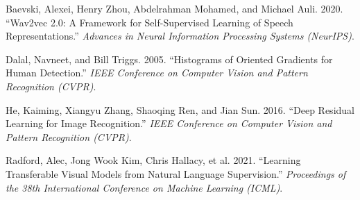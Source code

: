 \rujukanheading

\protect{}\label{refs}
\begin{CSLReferences}{1}{1}
Baevski, Alexei, Henry Zhou, Abdelrahman Mohamed, and Michael Auli. 2020. {``Wav2vec 2.0: A Framework for Self-Supervised Learning of Speech Representations.''} \emph{Advances in Neural Information Processing Systems (NeurIPS)}.

Dalal, Navneet, and Bill Triggs. 2005. {``Histograms of Oriented Gradients for Human Detection.''} \emph{IEEE Conference on Computer Vision and Pattern Recognition (CVPR)}.

He, Kaiming, Xiangyu Zhang, Shaoqing Ren, and Jian Sun. 2016. {``Deep Residual Learning for Image Recognition.''} \emph{IEEE Conference on Computer Vision and Pattern Recognition (CVPR)}.

Radford, Alec, Jong Wook Kim, Chris Hallacy, et al. 2021. {``Learning Transferable Visual Models from Natural Language Supervision.''} \emph{Proceedings of the 38th International Conference on Machine Learning (ICML)}.

\end{CSLReferences}
